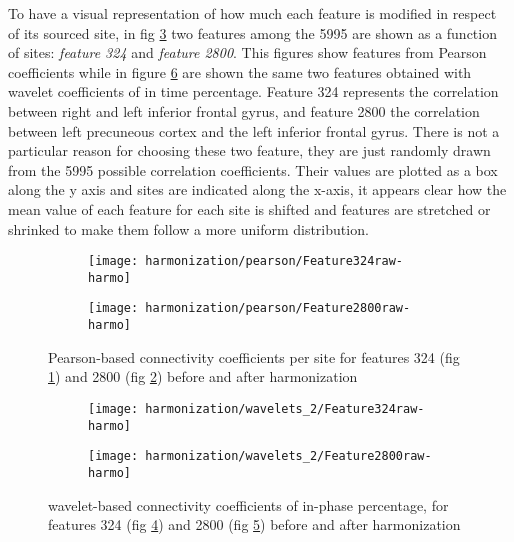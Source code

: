 \documentclass[11pt]{report}
\begin{document}
To have a visual representation of how much each feature is modified in respect of its sourced site, in fig \ref{fig:features_raw-harmo} two features among the 5995 are shown as a function of sites: \emph{feature 324} and \emph{feature 2800}. This figures show features from Pearson coefficients while in figure \ref{fig:wavelet_features_raw-harmo} are shown the same two features obtained with wavelet coefficients of in time percentage.
Feature 324 represents the correlation between right and left inferior frontal gyrus, and feature 2800 the correlation between left precuneous cortex and the left inferior frontal gyrus. There is not a particular reason for choosing these two feature, they are just randomly drawn from the 5995 possible correlation coefficients.
Their values are plotted as a box along the y axis and sites are indicated along the x-axis, it appears clear how the mean value of each feature for each site is shifted and features are stretched or shrinked to make them follow a more uniform distribution.

\begin{figure}
\centering
\begin{subfigure}[b]{1.\textwidth}
   \texttt{[image: harmonization/pearson/Feature324raw-harmo]}
   \caption{}
   \label{fig:feature324}
\end{subfigure}
\begin{subfigure}[b]{1.\textwidth}
   \texttt{[image: harmonization/pearson/Feature2800raw-harmo]}
   \caption{}
   \label{fig:feature2800}
\end{subfigure}
\caption{Pearson-based connectivity coefficients per site for features 324 (fig \ref{fig:feature324}) and 2800 (fig \ref{fig:feature2800}) before and after harmonization}
\label{fig:features_raw-harmo}
\end{figure}



 \begin{figure}
 \centering
 \begin{subfigure}[b]{1.\textwidth}
    \texttt{[image: harmonization/wavelets\_2/Feature324raw-harmo]}
    \caption{}
    \label{fig:wavelet_feature324}
 \end{subfigure}
 \begin{subfigure}[b]{1.\textwidth}
    \texttt{[image: harmonization/wavelets\_2/Feature2800raw-harmo]}
    \caption{}
    \label{fig:wavelet_feature2800}
 \end{subfigure}
 \caption{wavelet-based connectivity coefficients of in-phase percentage, for features 324 (fig \ref{fig:wavelet_feature324}) and 2800 (fig \ref{fig:wavelet_feature2800}) before and after harmonization}
 \label{fig:wavelet_features_raw-harmo}
 \end{figure}
\end{document}
